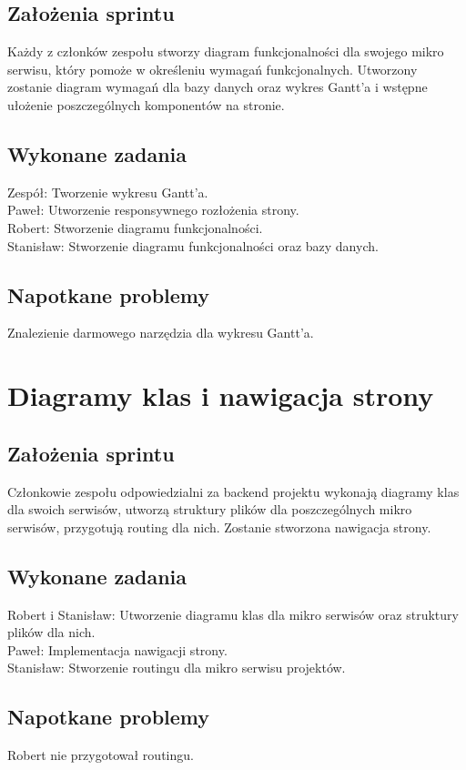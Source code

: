 \documentclass[a4paper,11pt]{report}
\begin{document}
\subsection {Założenia sprintu}
Każdy z członków zespołu stworzy diagram funkcjonalności dla swojego mikro serwisu, który pomoże w określeniu wymagań funkcjonalnych. Utworzony zostanie diagram wymagań dla bazy danych oraz wykres Gantt’a i wstępne ułożenie poszczególnych komponentów na stronie.
\subsection {Wykonane zadania}
Zespół: Tworzenie wykresu Gantt'a.\\
Paweł: Utworzenie responsywnego rozłożenia strony. \\
Robert: Stworzenie diagramu funkcjonalności. \\
Stanisław: Stworzenie diagramu funkcjonalności oraz bazy danych.\\
\subsection {Napotkane problemy}
Znalezienie darmowego narzędzia dla wykresu Gantt'a.

\section {Diagramy klas i nawigacja strony}
\subsection {Założenia sprintu}
Członkowie zespołu odpowiedzialni za backend projektu wykonają diagramy klas dla swoich serwisów, utworzą struktury plików dla poszczególnych mikro serwisów, przygotują routing dla nich. Zostanie stworzona nawigacja strony.
\subsection {Wykonane zadania}
Robert i Stanisław: Utworzenie diagramu klas dla mikro serwisów oraz struktury plików dla nich.\\
Paweł: Implementacja nawigacji strony. \\
Stanisław: Stworzenie routingu dla mikro serwisu projektów.\\
\subsection {Napotkane problemy}
Robert nie przygotował routingu.
\end{document}
